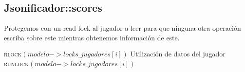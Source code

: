 \documentclass[a4paper,10pt,twoside]{article}
\newenvironment{pseudo}[1][]{%
    \vspace{0.5em}%
    \begin{algorithmic}%
}
{%
    \end{algorithmic}%
    \vspace{0.5em}%
}
\newcommand{\Fn}[2]{\textsc{#1}$(#2)$}
\begin{document}
\subsection{Jsonificador::scores}
Protegemos con un read lock al jugador a leer para que ninguna otra operación escriba
sobre este mientras obtenemos información de este.
\begin{pseudo}
       \State \Fn{rlock}{modelo->locks\_jugadores[i]}
       \State Utilización de datos del jugador
       \State \Fn{runlock}{modelo->locks\_jugadores[i]}
    \EndFor
\end{pseudo}
\end{document}
